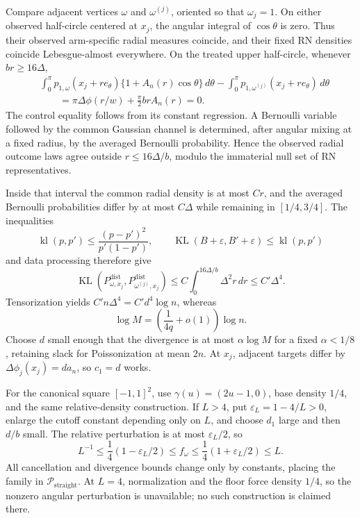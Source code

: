 Compare adjacent vertices \(\omega\) and \(\omega^{(j)}\), oriented so that \(\omega_j=1\).  On either observed half-circle centered at \(x_j\), the angular integral of \(\cos\theta\) is zero.  Thus their observed arm-specific radial measures coincide, and their fixed RN densities coincide Lebesgue-almost everywhere.  On the treated upper half-circle, whenever \(br\geq16\Delta\),
\[
\begin{aligned}
 &\int_0^\pi p_{1,\omega}(x_j+re_\theta)
 \{1+A_n(r)\cos\theta\}\,d\theta
 -\int_0^\pi p_{1,\omega^{(j)}}(x_j+re_\theta)\,d\theta\\
 &\qquad=\pi\Delta\phi(r/w)+\frac\pi2brA_n(r)=0.
\end{aligned}
\]
The control equality follows from its constant regression.  A Bernoulli variable followed by the common Gaussian channel is determined, after angular mixing at a fixed radius, by the averaged Bernoulli probability.  Hence the observed radial outcome laws agree outside \(r\leq16\Delta/b\), modulo the immaterial null set of RN representatives.

Inside that interval the common radial density is at most \(Cr\), and the averaged Bernoulli probabilities differ by at most \(C\Delta\) while remaining in \([1/4,3/4]\).  The inequalities
\[
 \operatorname{kl}(p,p')\leq\frac{(p-p')^2}{p'(1-p')},
 \qquad
 \operatorname{KL}(B+\varepsilon,B'+\varepsilon)
 \leq\operatorname{kl}(p,p')
\]
and data processing therefore give
\[
 \operatorname{KL}(P^{\mathrm{dist}}_{\omega,x_j},
 P^{\mathrm{dist}}_{\omega^{(j)},x_j})
 \leq C\int_0^{16\Delta/b}\Delta^2r\,dr
 \leq C'\Delta^4.
\]
Tensorization yields \(C'n\Delta^4=C'd^4\log n\), whereas
\[
 \log M=\left(\frac1{4q}+o(1)\right)\log n.
\]
Choose \(d\) small enough that the divergence is at most \(\alpha\log M\) for a fixed \(\alpha<1/8\), retaining slack for Poissonization at mean \(2n\).  At \(x_j\), adjacent targets differ by \(\Delta\phi_j(x_j)=da_n\), so \(c_1=d\) works.

For the canonical square \([-1,1]^2\), use \(\gamma(u)=(2u-1,0)\), base density \(1/4\), and the same relative-density construction.  If \(L>4\), put \(\varepsilon_L=1-4/L>0\), enlarge the cutoff constant depending only on \(L\), and choose \(d_1\) large and then \(d/b\) small.  The relative perturbation is at most \(\varepsilon_L/2\), so
\[
 L^{-1}\leq\frac14(1-\varepsilon_L/2)
 \leq f_\omega\leq\frac14(1+\varepsilon_L/2)\leq L.
\]
All cancellation and divergence bounds change only by constants, placing the family in \(\mathcal P_{\mathrm{straight}}\).  At \(L=4\), normalization and the floor force density \(1/4\), so the nonzero angular perturbation is unavailable; no such construction is claimed there.